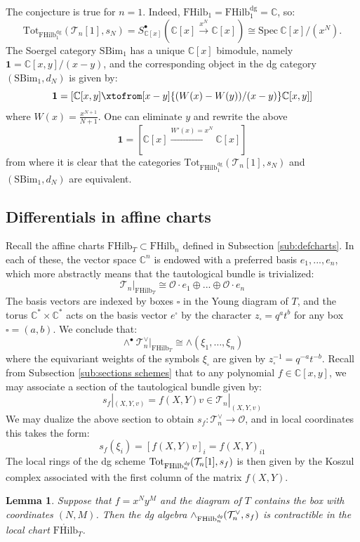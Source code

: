 \documentclass[12pt]{amsart}
\numberwithin{equation}{section}
\newtheorem{lemma}[theorem]{Lemma}
\theoremstyle{definition}
\theoremstyle{remark}
\newcommand{\CC}{\mathbb{C}}
\newcommand{\CO}{\mathcal{O}}
\newcommand{\CT}{\mathcal{T}}
\renewcommand{\1}{\mathbf{1}}
\newcommand{\FH}{\mathrm{FHilb}}
\newcommand{\oFH}{\mathring{\FH}}
\newcommand{\spec}{\mathrm{Spec}}
\newcommand{\SBim}{\mathrm{SBim}}
\newcommand{\torus}{\CC^{*} \times \CC^*}
\newcommand{\sq}{\square}
\newcommand{\dg}{\text{dg}}%
\newcommand{\edg}{\emph{dg}}
\newcommand{\tot}{\mathrm{Tot}}
\begin{document}
The conjecture is true for $n=1$. Indeed, $\FH_1=\FH_1^\dg = \CC$, so: 
$$
\tot_{\FH_1^\dg} (\CT_n[1],s_N) = S_{\CC[x]}^\bullet \left(\CC[x] \stackrel{x^N}\longrightarrow \CC[x] \right) \cong \spec \ \CC[x]/(x^N).
$$
The Soergel category $\SBim_1$ has a unique $\CC[x]$ bimodule, namely $\1 = \CC[x,y]/(x-y)$, and the corresponding object in the dg category $(\SBim_1,d_N)$ is given by:
$$
\1 = \left[ \CC[x,y]\xtofrom[x-y]{(W(x)-W(y))/(x-y)}\CC[x,y] \right] 
$$
where $W(x)=\frac{x^{N+1}}{N+1}$. One can eliminate $y$ and rewrite the above
$$
\1 = \left[ \CC[x]\xrightarrow{W'(x)=x^N}\CC[x] \right]
$$
from where it is clear that the categories $\tot_{\FH_1^\dg} (\CT_n[1],s_N)$ and $(\SBim_1,d_N)$ are equivalent.
 
\subsection{Differentials in affine charts}
\label{sub:affine diff}

Recall the affine charts $\FH_T \subset \FH_n$ defined in Subsection \ref{sub:defcharts}. In each of these, the vector space $\CC^n$ is endowed with a preferred basis $e_1,...,e_n$, which more abstractly means that the tautological bundle is trivialized:
$$
\CT_n|_{\FH_T} \cong \CO \cdot e_1 \oplus...\oplus \CO \cdot e_n
$$
The basis vectors are indexed by boxes $\sq$ in the Young diagram of $T$, and the torus $\torus$ acts on the basis vector $e^\sq$ by the character $z_\sq = q^at^b$ for any box $\sq = (a,b)$. We conclude that:
$$
\wedge^{\bullet}\CT_n^{\vee}|_{\FH_T} \cong \wedge(\xi_1,\ldots,\xi_n)
$$
where the equivariant weights of the symbols $\xi_\sq$ are given by $z_\sq^{-1} = q^{-a}t^{-b}$. Recall from Subsection \ref{sub:sections schemes} that to any polynomial $f\in \CC[x,y]$, we may associate a section of the tautological bundle given by:
\begin{equation}
\label{eqn:diff chart}
s_f|_{(X,Y,v)} = f(X,Y)v \in \CT_n|_{(X,Y,v)}
\end{equation}
We may dualize the above section to obtain $s_f:\CT_n^\vee \rightarrow \CO$, and in local coordinates this takes the form: 
\begin{equation}
\label{eqn:dual diff chart}
s_f(\xi_i)=[f(X,Y)v]_{i} = f(X,Y)_{i1}
\end{equation}
The local rings of the dg scheme $\tot_{\FH_n^\edg} (\CT_n[1],s_f)$ is then given by the Koszul complex associated with the first column of the matrix $f(X,Y)$.

\begin{lemma}
Suppose that $f=x^Ny^M$ and the diagram of $T$ contains the box with coordinates $(N,M)$.
Then the dg algebra $\wedge_{\FH_n^\edg} (\CT_n^\vee,s_f)$ is contractible in the local chart $\oFH_T$. 
\end{lemma}
\end{document}
